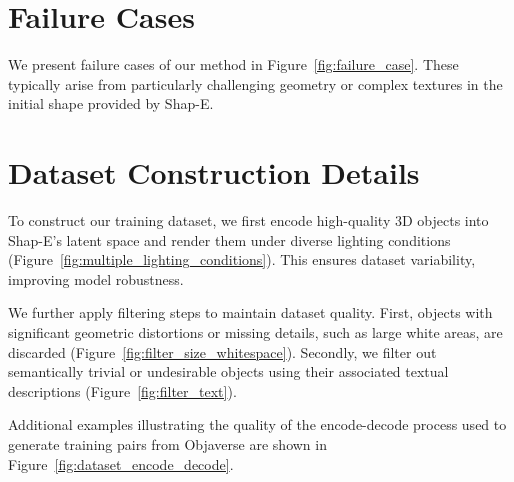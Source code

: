 \section{Failure Cases}

We present failure cases of our method in Figure~\ref{fig:failure_case}. These typically arise from particularly challenging geometry or complex textures in the initial shape provided by Shap-E.


\section{Dataset Construction Details}

To construct our training dataset, we first encode high-quality 3D objects into Shap-E's latent space and render them under diverse lighting conditions (Figure~\ref{fig:multiple_lighting_conditions}). This ensures dataset variability, improving model robustness.


We further apply filtering steps to maintain dataset quality. First, objects with significant geometric distortions or missing details, such as large white areas, are discarded (Figure~\ref{fig:filter_size_whitespace}). Secondly, we filter out semantically trivial or undesirable objects using their associated textual descriptions (Figure~\ref{fig:filter_text}).



Additional examples illustrating the quality of the encode-decode process used to generate training pairs from Objaverse are shown in Figure~\ref{fig:dataset_encode_decode}.

